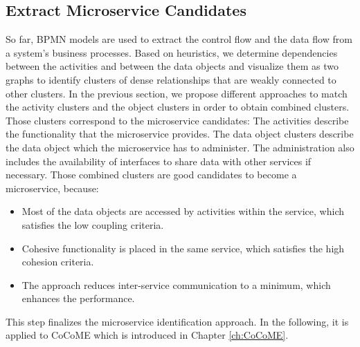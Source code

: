 \subsection{Extract Microservice Candidates}
\label{sec:Solution:ExtractMicroserviceCandidates}
So far, BPMN models are used to extract the control flow and the data flow from a system's business processes. Based on heuristics, we determine dependencies between the activities and between the data objects and visualize them as two graphs to identify clusters of dense relationships that are weakly connected to other clusters. In the previous section, we propose different approaches to match the activity clusters and the object clusters in order to obtain combined clusters. Those clusters correspond to the microservice candidates: The activities describe the functionality that the microservice provides. The data object clusters describe the data object which the microservice has to administer. The administration also includes the availability of interfaces to share data with other services if necessary.
Those combined clusters are good candidates to become a microservice, because:
\begin{itemize}
	\item Most of the data objects are accessed by activities within the service, which satisfies the low coupling criteria.
	\item Cohesive functionality is placed in the same service, which satisfies the high cohesion criteria.
	\item The approach reduces inter-service communication to a minimum, which enhances the performance.
\end{itemize}

\noindent
This step finalizes the microservice identification approach. In the following, it is applied to CoCoME which is introduced in Chapter \ref{ch:CoCoME}. 










